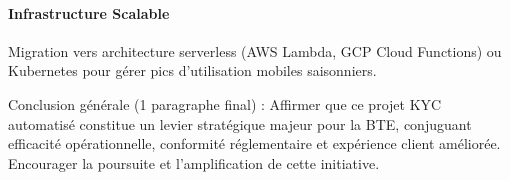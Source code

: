 \paragraph{Infrastructure Scalable}
Migration vers architecture serverless (AWS Lambda, GCP Cloud Functions) ou Kubernetes pour gérer pics d'utilisation mobiles saisonniers.

Conclusion générale (1 paragraphe final) : Affirmer que ce projet KYC automatisé constitue un levier stratégique majeur pour la BTE, conjuguant efficacité opérationnelle, conformité réglementaire et expérience client améliorée. Encourager la poursuite et l'amplification de cette initiative.


